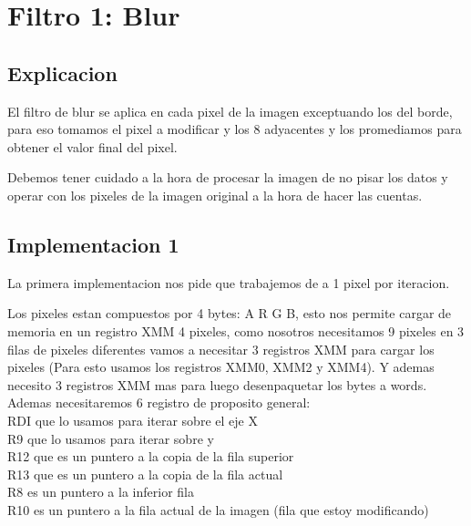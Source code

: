 \section{Filtro 1: Blur}

\subsection{Explicacion}
El filtro de blur se aplica en cada pixel de la imagen exceptuando los del borde, para eso tomamos el pixel a modificar y los 8 adyacentes y los promediamos para obtener el valor final del pixel.

Debemos tener cuidado a la hora de procesar la imagen de no pisar los datos y operar con los pixeles de la imagen original a la hora de hacer las cuentas.

\subsection{Implementacion 1}
La primera implementacion nos pide que trabajemos de a 1 pixel por iteracion.

Los pixeles estan compuestos por 4 bytes: A R G B, esto nos permite cargar de memoria en un registro XMM 4 pixeles, como nosotros necesitamos 9 pixeles en 3 filas de pixeles diferentes vamos a necesitar 3 registros XMM para cargar los pixeles (Para esto usamos los registros XMM0, XMM2 y XMM4). Y ademas necesito 3 registros XMM mas para luego desenpaquetar los bytes a words. \\

Ademas necesitaremos 6 registro de proposito general: \\
RDI que lo usamos para iterar sobre el eje X \\
R9 que lo usamos para iterar sobre y \\
R12 que es un puntero a la copia de la fila superior \\
R13 que es un puntero a la copia de la fila actual \\
R8 es un puntero a la inferior fila \\
R10 es un puntero a la fila actual de la imagen (fila que estoy modificando) \\

